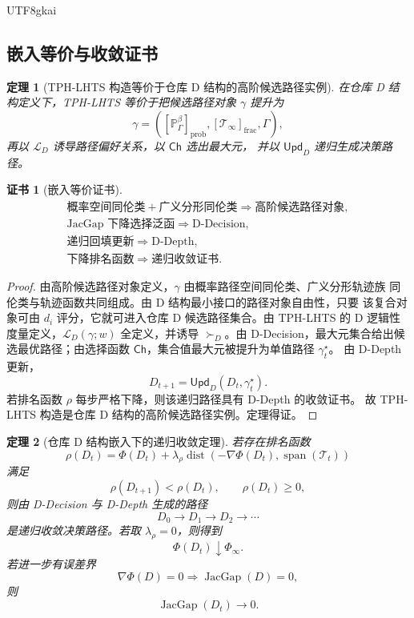 \documentclass[12pt]{article}
\newtheorem{theorem}{定理}[section]
\newtheorem{Certificate}{证书}[section]
\DeclareMathOperator{\JacGap}{JacGap}
\DeclareMathOperator{\Span}{span}
\DeclareMathOperator{\dist}{dist}
\begin{document}
\begin{CJK*}{UTF8}{gkai}
\subsection{嵌入等价与收敛证书}
\label{subsec:embedding-equivalence-convergence-certificate}

\begin{theorem}[TPH-LHTS 构造等价于仓库 D 结构的高阶候选路径实例]
在仓库 D 结构定义下，TPH-LHTS 等价于把候选路径对象 \(\gamma\) 提升为
\[
\boxed{
\gamma
=
\left(
[\mathbb P_\Gamma^\beta]_{\mathrm{prob}},
[\mathcal T_\infty]_{\mathrm{frac}},
\Gamma
\right),
}
\]
再以 \(\mathcal L_D\) 诱导路径偏好关系，以 \(\mathsf{Ch}\) 选出最大元，
并以 \(\mathsf{Upd}_D\) 递归生成决策路径。
\end{theorem}

\begin{Certificate}[嵌入等价证书]
\[
\boxed{
\begin{gathered}
\text{概率空间同伦类}
+
\text{广义分形同伦类}
\Rightarrow
\text{高阶候选路径对象},
\\
\text{JacGap 下降选择泛函}
\Rightarrow
\text{D-Decision},
\\
\text{递归回填更新}
\Rightarrow
\text{D-Depth},
\\
\text{下降排名函数}
\Rightarrow
\text{递归收敛证书}.
\end{gathered}
}
\]
\end{Certificate}

\begin{proof}
由高阶候选路径对象定义，\(\gamma\) 由概率路径空间同伦类、广义分形轨迹族
同伦类与轨迹函数共同组成。由 D 结构最小接口的路径对象自由性，只要
该复合对象可由 \(d_i\) 评分，它就可进入仓库 D 候选路径集合。由
TPH-LHTS 的 D 逻辑性度量定义，\(\mathcal L_D(\gamma;w)\) 全定义，并诱导
\(\succ_D\)。由 D-Decision，最大元集合给出候选最优路径；由选择函数
\(\mathsf{Ch}\)，集合值最大元被提升为单值路径 \(\gamma_t^\star\)。
由 D-Depth 更新，
\[
D_{t+1}=\mathsf{Upd}_D(D_t,\gamma_t^\star).
\]
若排名函数 \(\rho\) 每步严格下降，则该递归路径具有 D-Depth 的收敛证书。
故 TPH-LHTS 构造是仓库 D 结构的高阶候选路径实例。定理得证。
\end{proof}

\begin{theorem}[仓库 D 结构嵌入下的递归收敛定理]
若存在排名函数
\[
\rho(D_t)
=
\Phi(D_t)
+
\lambda_\rho
\dist\!\left(
-\nabla\Phi(D_t),
\Span(\mathcal T_t)
\right)
\]
满足
\[
\rho(D_{t+1})<\rho(D_t),
\qquad
\rho(D_t)\ge0,
\]
则由 D-Decision 与 D-Depth 生成的路径
\[
D_0\to D_1\to D_2\to\cdots
\]
是递归收敛决策路径。若取 \(\lambda_\rho=0\)，则得到
\[
\Phi(D_t)\downarrow\Phi_\infty.
\]
若进一步有误差界
\[
\nabla\Phi(D)=0\Rightarrow\JacGap(D)=0,
\]
则
\[
\JacGap(D_t)\to0.
\]
\end{theorem}


\end{CJK*}
\end{document}
